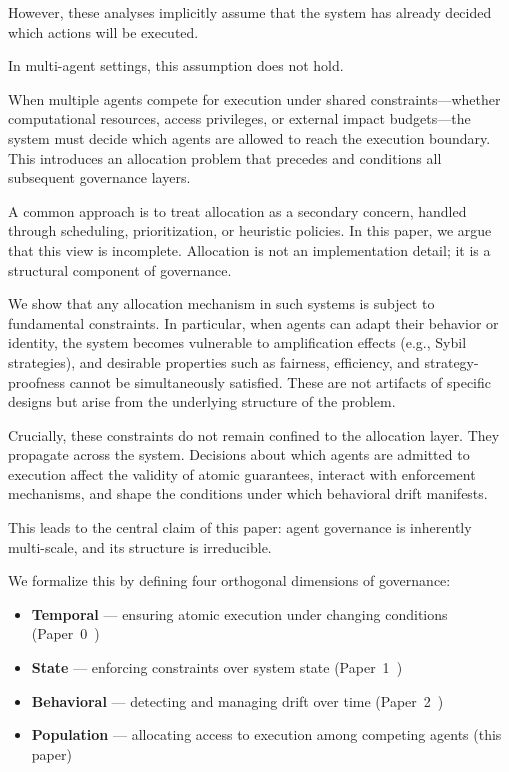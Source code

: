 \documentclass[11pt]{article}
\begin{document}
However, these analyses implicitly assume that the system has already decided which actions will be executed.

In multi-agent settings, this assumption does not hold.

When multiple agents compete for execution under shared constraints---whether computational resources, access privileges, or external impact budgets---the system must decide which agents are allowed to reach the execution boundary. This introduces an allocation problem that precedes and conditions all subsequent governance layers.

A common approach is to treat allocation as a secondary concern, handled through scheduling, prioritization, or heuristic policies. In this paper, we argue that this view is incomplete. Allocation is not an implementation detail; it is a structural component of governance.

We show that any allocation mechanism in such systems is subject to fundamental constraints. In particular, when agents can adapt their behavior or identity, the system becomes vulnerable to amplification effects (e.g., Sybil strategies), and desirable properties such as fairness, efficiency, and strategy-proofness cannot be simultaneously satisfied. These are not artifacts of specific designs but arise from the underlying structure of the problem.

Crucially, these constraints do not remain confined to the allocation layer. They propagate across the system. Decisions about which agents are admitted to execution affect the validity of atomic guarantees, interact with enforcement mechanisms, and shape the conditions under which behavioral drift manifests.

This leads to the central claim of this paper: agent governance is inherently multi-scale, and its structure is irreducible.

We formalize this by defining four orthogonal dimensions of governance:
\begin{itemize}
  \item \textbf{Temporal} --- ensuring atomic execution under changing conditions (Paper~0~\cite{fernandez2026a})
  \item \textbf{State} --- enforcing constraints over system state (Paper~1~\cite{fernandez2026b})
  \item \textbf{Behavioral} --- detecting and managing drift over time (Paper~2~\cite{fernandez2026c})
  \item \textbf{Population} --- allocating access to execution among competing agents (this paper)
\end{itemize}
\end{document}
